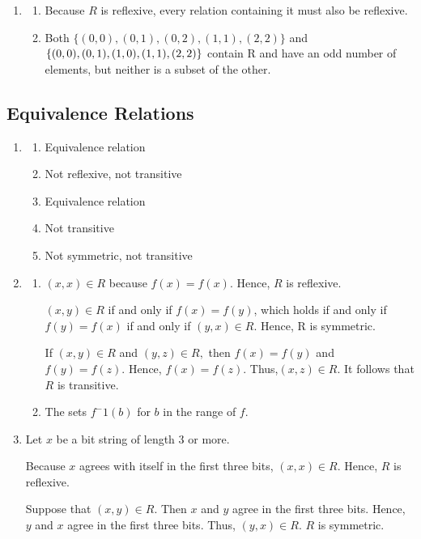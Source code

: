 \documentclass{sig-alternate-05-2015}
\begin{document}
\begin{enumerate}
\item 
	\begin{enumerate}
		\item Because $R$ is reflexive, every
		relation containing it must also be reflexive.
		\item Both $\{(0, 0),
			(0, 1), (0, 2), (1, 1), (2, 2)\}$ and $\{(0, 0),\\ (0, 1), (1, 0), (1, 1),
			(2, 2)\}$ contain R and have an odd number of elements, but
		neither is a subset of the other.
	\end{enumerate}
\end{enumerate}
\subsection{Equivalence Relations}
\begin{enumerate}
\item
	\begin{enumerate}
		\item Equivalence relation \item Not reflexive, not transitive
		\item Equivalence relation \item Not transitive \item Not symmetric,
		not transitive
	\end{enumerate}
\item
	\begin{enumerate}
		\item  $(x, x) \in R $ because $f (x) = f (x)$. Hence, $R$ is reflexive.
		
		$(x, y) \in R$ if and only if $f (x) = f (y)$, which holds if and
		only if $f (y) = f (x)$ if and only if $(y, x) \in R.$ Hence, R is
		symmetric. 
		
		If $(x, y) \in R$ and $(y, z) \in R,$ then $f (x) = f (y)$
		and $f (y) = f (z)$. Hence, $f (x) = f (z)$. Thus,$ (x, z) \in R$.
		It follows that $R$ is transitive. 
		\item   The sets $f^−1(b)$ for $b$ in the range of $f$.
	\end{enumerate}

\item 
Let $x$ be a bit string of length 3 or more.

Because $x$ agrees with itself in the first three bits, $(x, x)\in R.$
Hence, $R$ is reflexive. 

Suppose that $(x, y) \in R.$ Then $x$ and $y$ agree in the first three bits. 
Hence, $y$ and $x$ agree in the first three bits. Thus, $(y, x)\in R$. $R$ is symmetric.


\end{enumerate}
\end{document}
